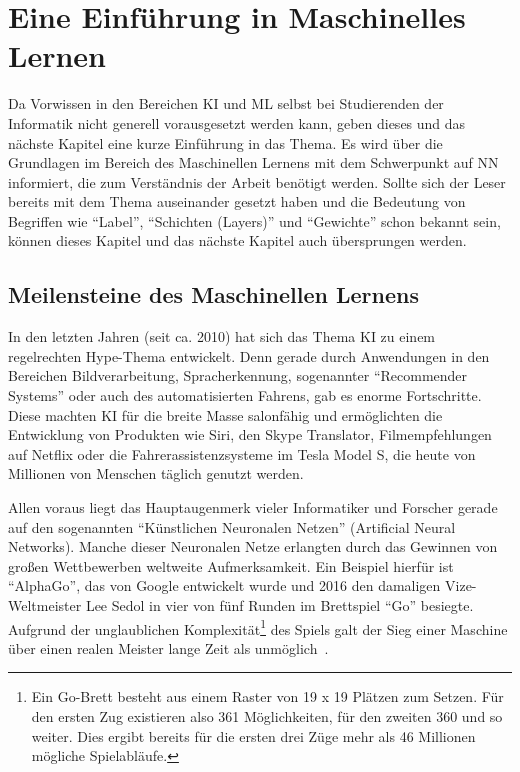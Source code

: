 \chapter{Eine Einführung in Maschinelles Lernen}
Da Vorwissen in den Bereichen \gls{KI} und \gls{ML} selbst bei Studierenden der Informatik nicht generell vorausgesetzt werden kann, geben dieses und das nächste Kapitel eine kurze Einführung in das Thema. Es wird über die Grundlagen im Bereich des Maschinellen Lernens mit dem Schwerpunkt auf \gls{NN} informiert, die zum Verständnis der Arbeit benötigt werden. Sollte sich der Leser bereits mit dem Thema auseinander gesetzt haben und die Bedeutung von Begriffen wie "`\gls{Label}"', "`Schichten (Layers)"' und "`Gewichte"' schon bekannt sein, können dieses Kapitel und das nächste Kapitel auch übersprungen werden.

\section{Meilensteine des Maschinellen Lernens} \label{sec:milestones}
In den letzten Jahren (seit ca. 2010) hat sich das Thema \gls{KI} zu einem regelrechten Hype-Thema entwickelt. Denn gerade durch Anwendungen in den Bereichen Bildverarbeitung, Spracherkennung, sogenannter "`Recommender Systems"' oder auch des automatisierten Fahrens, gab es enorme Fortschritte. Diese machten \gls{KI} für die breite Masse salonfähig und ermöglichten die Entwicklung von Produkten wie Siri, den Skype Translator, Filmempfehlungen auf Netflix oder die Fahrerassistenzsysteme im Tesla Model S, die heute von Millionen von Menschen täglich genutzt werden.

Allen voraus liegt das Hauptaugenmerk vieler Informatiker und Forscher gerade auf den sogenannten "`Künstlichen Neuronalen Netzen"' (Artificial Neural Networks). Manche dieser Neuronalen Netze erlangten durch das Gewinnen von großen Wettbewerben weltweite Aufmerksamkeit. Ein Beispiel hierfür ist "`AlphaGo"', das von Google entwickelt wurde und 2016 den damaligen Vize-Weltmeister Lee Sedol in vier von fünf Runden im Brettspiel "`Go"' besiegte. Aufgrund der unglaublichen Komplexität\footnote{Ein Go-Brett besteht aus einem Raster von 19 x 19 Plätzen zum Setzen. Für den ersten Zug existieren also 361 Möglichkeiten, für den zweiten 360 und so weiter. Dies ergibt bereits für die ersten drei Züge mehr als 46 Millionen mögliche Spielabläufe.} des Spiels galt der Sieg einer Maschine über einen realen Meister lange Zeit als unmöglich~\cite{alphaGo}.

